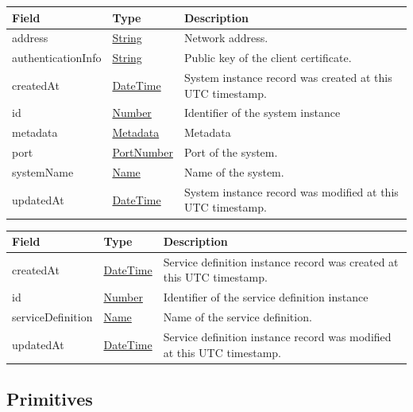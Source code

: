 \documentclass[a4paper]{arrowhead}
\newcommand{\pref}[1]{{\textcolor{ArrowheadGrey}{\hyperref[sec:model:primitives:#1]{#1}}}}
\begin{document}
\clearpage


\begin{table}[ht!]
\begin{tabularx}{\textwidth}{| p{4.25cm} | p{3.5cm} | X |} \hline
\rowcolor{gray!33} Field & Type      & Description \\ \hline
address & \pref{String} & Network address. \\ \hline
authenticationInfo & \pref{String}     & Public key of the client certificate. \\ \hline
createdAt & \pref{DateTime} & System instance record was created at this UTC timestamp. \\ \hline
id & \pref{Number} & Identifier of the system instance \\ \hline
metadata & \pref{Metadata}     & Metadata \\ \hline
port & \pref{PortNumber} & Port of the system. \\ \hline
systemName &\pref{Name}  & Name of the system. \\ \hline
updatedAt & \pref{DateTime} & System instance record was modified at this UTC timestamp. \\ \hline
\end{tabularx}
\end{table}


\begin{table}[ht!]
\begin{tabularx}{\textwidth}{| p{4.25cm} | p{3.5cm} | X |} \hline
\rowcolor{gray!33} Field & Type      & Description \\ \hline
createdAt & \pref{DateTime} & Service definition instance record was created at this UTC timestamp. \\ \hline
id & \pref{Number} & Identifier of the service definition instance \\ \hline
serviceDefinition &\pref{Name}  & Name of the service definition. \\ \hline
updatedAt & \pref{DateTime} & Service definition instance record was modified at this UTC timestamp. \\ \hline
\end{tabularx}
\end{table}

\subsection{Primitives}
\label{sec:model:primitives}
\end{document}
